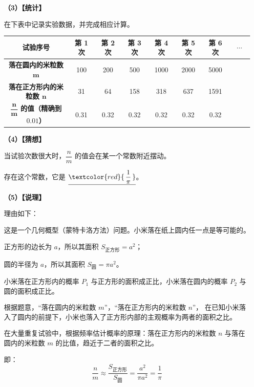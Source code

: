 \documentclass[12pt, a4paper]{ctexrep}
\begin{document}
\vspace{0.3cm}
\textbf{（3）【统计】}

在下表中记录实验数据，并完成相应计算。

\begin{center}
\renewcommand{\arraystretch}{1.6}
\begin{tabular}{|c|c|c|c|c|c|c|c|}
\hline
\cellcolor{gray!25} \textbf{试验序号} & 第 1 次 & 第 2 次 & 第 3 次 & 第 4 次 & 第 5 次 & 第 6 次 & $~~~\cdots~~~$ \\
\hline
\cellcolor{gray!25} \textbf{落在圆内的米粒数 $\boldsymbol{m}$} & 100 & 200 & 500 & 1000 & 2000 & 5000 & \\
\hline
\cellcolor{gray!25} \textbf{落在正方形内的米粒数 $\boldsymbol{n}$} & 31 & 64 & 158 & 318 & 637 & 1591 & \\
\hline
\cellcolor{gray!25} \textbf{$\dfrac{\boldsymbol{n}}{\boldsymbol{m}}$ 的值（精确到 $\boldsymbol{0.01}$）} & 0.31 & 0.32 & 0.32 & 0.32 & 0.32 & 0.32 & \\
\hline
\end{tabular}
\end{center}

\vspace{0.3cm}
\textbf{（4）【猜想】}

当试验次数很大时，$\dfrac{n}{m}$ 的值会在某一个常数附近摆动。

存在这个常数，它是 $\underline{\textcolor{red}{\,\dfrac{1}{\pi}\,}}$。

\vspace{0.3cm}
\textbf{（5）【说理】}

理由如下：

这是一个几何概型（蒙特卡洛方法）问题。小米落在纸上圆内任一点是等可能的。

正方形的边长为 $a$，所以其面积 $S_{\text{正方形}} = a^2$；

圆的半径为 $a$，所以其面积 $S_{\text{圆}} = \pi a^2$。

小米落在正方形内的概率 $P_1$ 与正方形的面积成正比，小米落在圆内的概率 $P_2$ 与圆的面积成正比。

根据题意，“落在圆内的米粒数 $m$”，“落在正方形内的米粒数 $n$”，
在已知小米落入了圆内的前提下，小米也落入了正方形内部的主观概率为两者的面积之比。

在大量重复试验中，根据频率估计概率的原理：落在正方形内的米粒数 $n$ 与落在圆内的米粒数 $m$ 的比值，趋近于二者的面积之比。

即：
$$\frac{n}{m} \approx \frac{S_{\text{正方形}}}{S_{\text{圆}}} = \frac{a^2}{\pi a^2} = \frac{1}{\pi}$$
\end{document}

